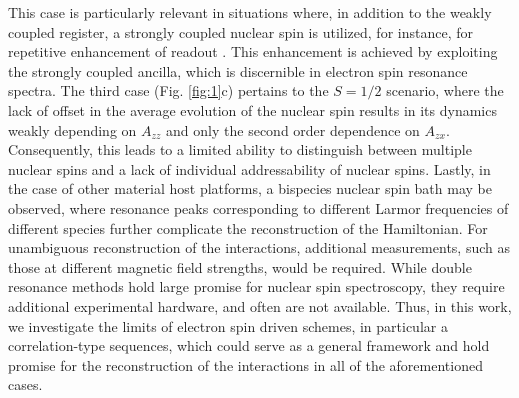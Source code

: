 \documentclass[%
 reprint,
superscriptaddress,
 amsmath,amssymb,
 aps,
]{revtex4-2}
\begin{document}
This case is particularly relevant in situations where, in addition to the weakly coupled register, a strongly coupled nuclear spin is utilized, for instance, for repetitive enhancement of readout \cite{neumann2010single}.
This enhancement is achieved by exploiting the strongly coupled ancilla, which is discernible in electron spin resonance spectra.
The third case (Fig. \ref{fig:1}c) pertains to the $S=1/2$ scenario, where the lack of offset in the average evolution of the nuclear spin results in its dynamics weakly depending on $A_{zz}$ and only the second order dependence on $A_{zx}$.
Consequently, this leads to a limited ability to distinguish between multiple nuclear spins and a lack of individual addressability of nuclear spins.
Lastly, in the case of other material host platforms, a bispecies nuclear spin bath may be observed, where resonance peaks corresponding to different Larmor frequencies of different species further complicate the reconstruction of the Hamiltonian.
For unambiguous reconstruction of the interactions, additional measurements, such as those at different magnetic field strengths, would be required.
While double resonance methods \cite{bradley2019ten,zaiser2016enhancing} hold large promise for nuclear spin spectroscopy, they require additional experimental hardware, and often are not available. 
Thus, in this work, we investigate the limits of electron spin driven schemes, in particular a correlation-type sequences, which could serve as a general framework and hold promise for the reconstruction of the interactions in all of the aforementioned cases.  
 




\end{document}
